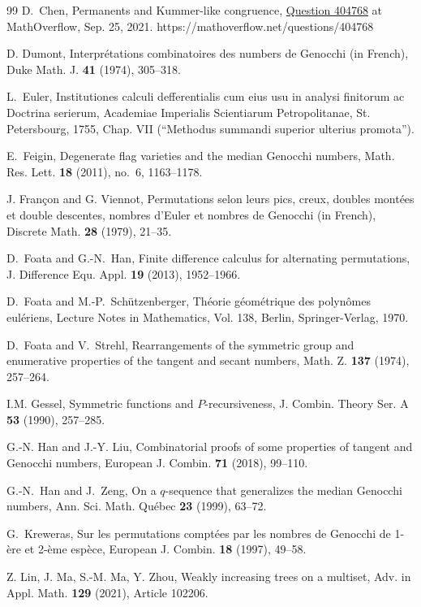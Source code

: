 \documentclass[11pt,reqno]{amsart}
\numberwithin{equation}{section}
\theoremstyle{plain}
\theoremstyle{definition}
\begin{document}
\begin{thebibliography}{99}
 D.~Chen, Permanents and Kummer-like congruence,
\href{https://mathoverflow.net/questions/404768}{Question 404768} at MathOverflow, Sep. 25, 2021.
https://mathoverflow.net/questions/404768

 D. Dumont, Interpr\'etations combinatoires des numbers de Genocchi (in French), Duke Math. J. {\bf 41} (1974), 305--318.

 L.~Euler, Institutiones calculi defferentialis cum eius usu in analysi finitorum ac Doctrina serierum, Academiae Imperialis Scientiarum Petropolitanae, St. Petersbourg, 1755, Chap. VII (``Methodus summandi superior ulterius promota'').

 E.~Feigin, Degenerate flag varieties and the median Genocchi numbers, Math. Res. Lett. {\bf 18} (2011), no.~6, 1163--1178.

  J. Fran\c{c}on and G. Viennot,  Permutations selon leurs pics, creux, doubles mont\'ees et double descentes, nombres d'Euler et nombres de Genocchi (in French),  Discrete Math. {\bf 28} (1979), 21--35.

 D.~Foata and G.-N.~Han, Finite difference calculus for alternating permutations, J. Difference Equ. Appl. {\bf 19} (2013), 1952--1966.

 D.~Foata and M.-P.~Sch\"utzenberger, Th\'eorie g\'eom\'etrique des polyn\^omes eul\'eriens, Lecture Notes in Mathematics, Vol. 138, Berlin, Springer-Verlag, 1970.

 D.~Foata and V.~Strehl, Rearrangements of the symmetric group and enumerative properties of the tangent and secant numbers, Math. Z. {\bf 137} (1974), 257--264.

 I.M. Gessel, Symmetric functions and $P$-recursiveness, J. Combin. Theory Ser. A {\bf 53} (1990), 257--285.

 G.-N. Han and J.-Y. Liu,
Combinatorial proofs of some properties of tangent and Genocchi numbers,
European J. Combin. {\bf 71} (2018), 99--110.

 G.-N.~Han and J.~Zeng, On a $q$-sequence that generalizes the median Genocchi numbers, Ann. Sci. Math. Qu\'ebec {\bf 23} (1999), 63--72.

 G.~Kreweras, Sur les permutations compt\'ees par les nombres de Genocchi de 1-\`ere et 2-\`eme esp\`ece, European J. Combin. {\bf 18} (1997), 49--58.

 Z. Lin, J. Ma, S.-M. Ma, Y. Zhou, Weakly increasing trees on a multiset, Adv. in Appl. Math. {\bf 129} (2021), Article 102206.


\end{thebibliography}
\end{document}
